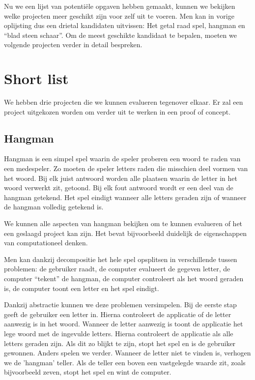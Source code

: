 Nu we een lijst van potentiële opgaven hebben gemaakt, kunnen we bekijken welke projecten meer geschikt zijn voor zelf uit te voeren. Men kan in vorige oplijsting dus een drietal kandidaten uitvissen: Het getal raad spel, hangman en “blad steen schaar”. Om de meest geschikte kandidaat te bepalen, moeten we volgende projecten verder in detail bespreken.

\section{Short list}

We hebben drie projecten die we kunnen evalueren tegenover elkaar. Er zal een project uitgekozen worden om verder uit te werken in een proof of concept.

\subsection{Hangman}

Hangman is een simpel spel waarin de speler proberen een woord te raden van een medespeler. Zo moeten de speler letters raden die misschien deel vormen van het woord. Bij elk juist antwoord worden alle plaatsen waarin de letter in het woord verwerkt zit, getoond. Bij elk fout antwoord wordt er een deel van de hangman getekend. Het spel eindigt wanneer alle letters geraden zijn of wanneer de hangman volledig getekend is.

We kunnen alle aspecten van hangman bekijken om te kunnen evalueren of het een geslaagd project kan zijn. Het bevat bijvoorbeeld duidelijk de eigenschappen van computationeel denken. 

Men kan dankzij decompositie het hele spel opsplitsen in verschillende tussen problemen: de gebruiker raadt, de computer evalueert de gegeven letter, de computer “tekent” de hangman, de computer controleert als het woord geraden is, de computer toont een letter en het spel eindigt. 

Dankzij abstractie kunnen we deze problemen versimpelen. Bij de eerste stap geeft de gebruiker een letter in. Hierna controleert de applicatie of de letter aanwezig is in het woord. Wanneer de letter aanwezig is toont de applicatie het lege woord met de ingevulde letters. Hierna controleert de applicatie als alle letters geraden zijn.  Als dit zo blijkt te zijn,  stopt het spel en is de gebruiker gewonnen. Anders spelen we verder. Wanneer de letter niet te vinden is, verhogen we de 'hangman' teller. Als de teller een boven een vastgelegde waarde zit, zoals bijvoorbeeld zeven, stopt het spel en wint de computer. 

